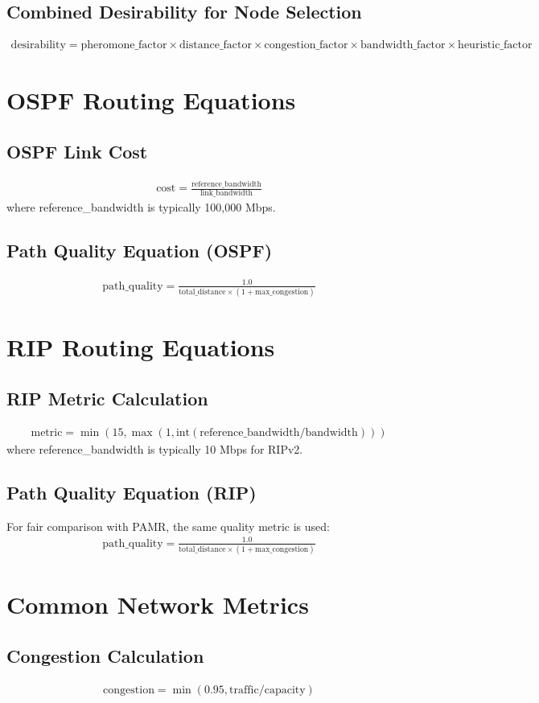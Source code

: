 \documentclass{article}
\begin{document}
\subsection{Combined Desirability for Node Selection}
\begin{align}
\text{desirability} = \text{pheromone\_factor} \times \text{distance\_factor} \times \text{congestion\_factor} \times \text{bandwidth\_factor} \times \text{heuristic\_factor}
\end{align}

\section{OSPF Routing Equations}

\subsection{OSPF Link Cost}
\begin{align}
\text{cost} = \frac{\text{reference\_bandwidth}}{\text{link\_bandwidth}}
\end{align}
where reference\_bandwidth is typically 100,000 Mbps.

\subsection{Path Quality Equation (OSPF)}
\begin{align}
\text{path\_quality} = \frac{1.0}{\text{total\_distance} \times (1 + \text{max\_congestion})}
\end{align}

\section{RIP Routing Equations}

\subsection{RIP Metric Calculation}
\begin{align}
\text{metric} = \min(15, \max(1, \text{int}(\text{reference\_bandwidth} / \text{bandwidth})))
\end{align}
where reference\_bandwidth is typically 10 Mbps for RIPv2.

\subsection{Path Quality Equation (RIP)}
For fair comparison with PAMR, the same quality metric is used:
\begin{align}
\text{path\_quality} = \frac{1.0}{\text{total\_distance} \times (1 + \text{max\_congestion})}
\end{align}

\section{Common Network Metrics}

\subsection{Congestion Calculation}
\begin{align}
\text{congestion} = \min(0.95, \text{traffic} / \text{capacity})
\end{align}
\end{document}
